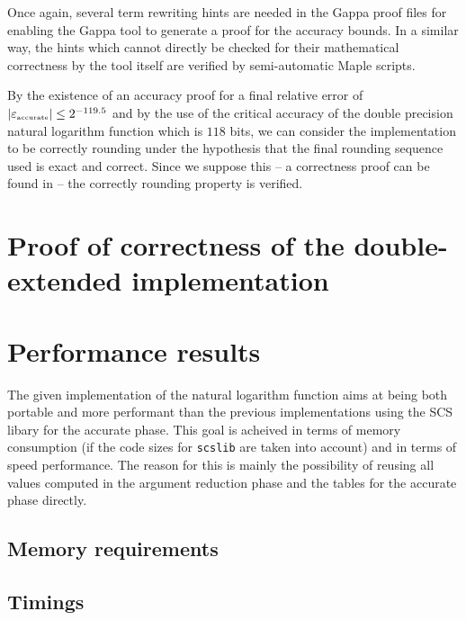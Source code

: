 Once again, several term rewriting hints are needed in the Gappa proof files for enabling the Gappa tool to 
generate a proof for the accuracy bounds. In a similar way, the hints which cannot directly be checked for their 
mathematical correctness by the tool itself are verified by semi-automatic Maple scripts.\par
By the existence of an accuracy proof for a final relative error of $\left \vert \epsilon_{\mbox{\tiny accurate}} \right \vert \leq 2^{-119.5}$ and
by the use of the critical accuracy of the double precision natural logarithm function which is 
$118$ bits\cite{DinDefLau2004LIP}, we can consider the implementation to be correctly rounding under the hypothesis
that the final rounding sequence used is exact and correct. Since we suppose this -- a correctness proof can be 
found in \cite{Lauter2005LIP:tripledouble} -- the correctly rounding property is verified.


\section{Proof of correctness of the double-extended implementation \label{sec:logdeproof}}


\section{Performance results\label{sec:logperf}}
The given implementation of the natural logarithm function aims at
being both portable and more performant than the previous
implementations using the SCS libary for the accurate phase.  This
goal is acheived in terms of memory consumption (if the code sizes for
{\tt scslib} are taken into account) and in terms of speed
performance. The reason for this is mainly the possibility of reusing
all values computed in the argument reduction phase and the tables for
the accurate phase directly.

\subsection{Memory requirements}



\subsection{Timings}